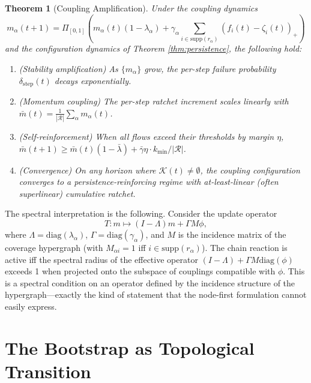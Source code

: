 \documentclass[11pt]{article}
\newtheorem{theorem}{Theorem}[section]
\theoremstyle{definition}
\theoremstyle{remark}
\begin{document}
\begin{theorem}[Coupling Amplification]
\label{thm:amplification}
Under the coupling dynamics
\begin{equation}
m_\alpha(t+1) = \Pi_{[0,1]}\left(m_\alpha(t)(1 - \lambda_\alpha) + \gamma_\alpha \sum_{i \in \mathrm{supp}(r_\alpha)} (f_i(t) - \zeta_i(t))_+\right)
\end{equation}
and the configuration dynamics of Theorem \ref{thm:persistence}, the following hold:
\begin{enumerate}
\item (Stability amplification) As $\{m_\alpha\}$ grow, the per-step failure probability $\delta_{\mathrm{step}}(t)$ decays exponentially.
\item (Momentum coupling) The per-step ratchet increment scales linearly with $\bar m(t) = \frac{1}{|\mathcal{R}|} \sum_\alpha m_\alpha(t)$.
\item (Self-reinforcement) When all flows exceed their thresholds by margin $\eta$, $\bar m(t+1) \geq \bar m(t)(1 - \bar\lambda) + \bar\gamma \eta \cdot k_{\min}/|\mathcal{R}|$.
\item (Convergence) On any horizon where $\mathcal{K}(t) \neq \emptyset$, the coupling configuration converges to a persistence-reinforcing regime with at-least-linear (often superlinear) cumulative ratchet.
\end{enumerate}
\end{theorem}

The spectral interpretation is the following. Consider the update operator
\begin{equation}
T: m \mapsto (I - \Lambda) m + \Gamma M \phi,
\end{equation}
where $\Lambda = \mathrm{diag}(\lambda_\alpha)$, $\Gamma = \mathrm{diag}(\gamma_\alpha)$, and $M$ is the incidence matrix of the coverage hypergraph (with $M_{\alpha i} = 1$ iff $i \in \mathrm{supp}(r_\alpha)$). The chain reaction is active iff the spectral radius of the effective operator $(I - \Lambda) + \Gamma M \mathrm{diag}(\phi)$ exceeds 1 when projected onto the subspace of couplings compatible with $\phi$. This is a spectral condition on an operator defined by the incidence structure of the hypergraph---exactly the kind of statement that the node-first formulation cannot easily express.

\section{The Bootstrap as Topological Transition}
\end{document}
